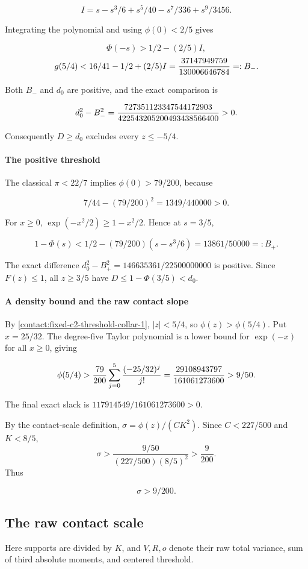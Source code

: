 \[
 I=s-s^3/6+s^5/40-s^7/336+s^9/3456.
\]

Integrating the polynomial and using $\phi(0)<2/5$ gives

\[
 \Phi(-s)>1/2-(2/5)I,
\]
\[
 g(5/4)<16/41-1/2+(2/5)I
 ={37147949759\over130006646784}=:B_-.
\]

Both $B_-$ and $d_0$ are positive, and the exact comparison is

\[
 d_0^2-B_-^2
 ={727351123347544172903\over422543205200493438566400}>0.
\]

Consequently $D\ge d_0$ excludes every $z\le -5/4$.

\paragraph{The positive threshold}

The classical $\pi<22/7$ implies $\phi(0)>79/200$, because

\[
 7/44-(79/200)^2=1349/440000>0.
\]

For $x\ge 0$, $\exp(-x^2/2)\ge 1-x^2/2$. Hence at $s=3/5$,

\[
 1-\Phi(s)<1/2-(79/200)(s-s^3/6)=13861/50000=:B_+.
\]

The exact difference $d_0^2-B_+^2=146635361/22500000000$ is positive.
Since $F(z)\le 1$, all $z\ge 3/5$ have $D\le 1-\Phi(3/5)<d_0$.

\paragraph{A density bound and the raw contact slope}

By \eqref{contact:fixed-c2-threshold-collar-1}, $|z|<5/4$, so $\phi(z)>\phi(5/4)$. Put $x=25/32$. The degree-five
Taylor polynomial is a lower bound for $\exp(-x)$ for all $x\ge 0$, giving

\[
 \phi(5/4)>{79\over200}\sum_{j=0}^{5}{(-25/32)^j\over j!}
 ={29108943797\over161061273600}>9/50.
\]

The final exact slack is $117914549/161061273600>0$.

By the contact-scale definition, $\sigma=\phi(z)/(CK^2)$.
Since $C<227/500$ and $K<8/5$,
\[
 \sigma>\frac{9/50}{(227/500)(8/5)^2}>\frac9{200}.
\]
Thus

\[
 \boxed{\sigma>9/200.}
\tag{B.3.2}\label{contact:fixed-c2-threshold-collar-2}
\]
\subsection{The raw contact scale}\label{contact:fixed-c2-contact-scale-collar}
Here supports are divided by $K$, and $V,R,o$ denote their raw total variance, sum of third absolute moments, and centered threshold.



